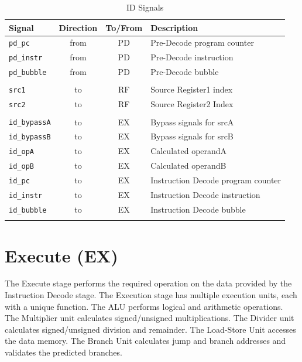 \begin{longtable}[]{@{}lccl@{}}
	\toprule
	\textbf{Signal} & \textbf{Direction} & \textbf{To/From} & \textbf{Description}\tabularnewline
	\midrule

	\endhead
	
		\texttt{pd\_pc}	     & from & PD & Pre-Decode program counter\\
		\texttt{pd\_instr}   & from & PD & Pre-Decode instruction\\
		\texttt{pd\_bubble}  & from & PD & Pre-Decode bubble\\
		& & &\\
		\texttt{src1}        & to   & RF & Source Register1 index\\
		\texttt{src2}        & to   & RF & Source Register2 Index\\
		& & &\\			
		\texttt{id\_bypassA} & to   & EX & Bypass signals for srcA\\
		\texttt{id\_bypassB} & to   & EX & Bypass signals for srcB\\
		\texttt{id\_opA}     & to   & EX & Calculated operandA\\
		\texttt{id\_opB}     & to   & EX & Calculated operandB\\
		\texttt{id\_pc}      & to   & EX & Instruction Decode program counter\\
		\texttt{id\_instr}   & to   & EX & Instruction Decode instruction\\
		\texttt{id\_bubble}  & to   & EX & Instruction Decode bubble\\	
	\bottomrule
	\caption{ID Signals}
	\label{tab:id-signals}
\end{longtable}

\pagebreak

\section{Execute (EX)}\label{execute-ex-1}

The Execute stage performs the required operation on the data provided by the Instruction Decode stage. 
The Execution stage has multiple execution units, each with a unique function.
The ALU performs logical and arithmetic operations.
The Multiplier unit calculates signed/unsigned multiplications.
The Divider unit calculates signed/unsigned division and remainder.
The Load-Store Unit accesses the data memory.
The Branch Unit calculates jump and branch addresses and validates the predicted branches.

